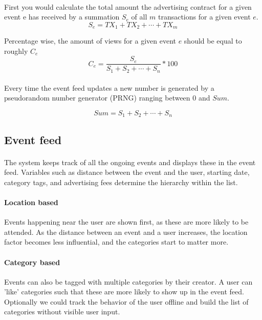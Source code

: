 \documentclass[a4paper]{article}
\begin{document}
\paragraph{}First you would calculate the total amount the advertising contract for a given event e has received by a summation $S_e$ of all $m$ transactions for a given event $e$.
\[S_e = TX_1 + TX_2 + \cdots + TX_m\]

Percentage wise, the amount of views for a given event $e$ should be equal to roughly $C_e$
\[C_e = \frac{S_e}{S_1 + S_2 + \cdots + S_n}*100\]

\paragraph{}
Every time the event feed updates a new number is generated by a pseudorandom number generator (PRNG) ranging between 0 and $Sum$. 

\[Sum = S_1 + S_2 + \cdots + S_n\]

\subsection{Event feed}
\paragraph{}The system keeps track of all the ongoing events and displays these in the event feed. Variables such as distance between the event and the user, starting date, category tags, and advertising fees determine the hierarchy within the list. 

\paragraph{Location based} Events happening near the user are shown first, as these are more likely to be attended. As the distance between an event and a user increases, the location factor becomes less influential, and the categories start to matter more.

\paragraph{Category based}Events can also be tagged with multiple categories by their creator. A user can 'like' categories such that these are more likely to show up in the event feed. Optionally we could track the behavior of the user offline and build the list of categories without visible user input.
\end{document}
